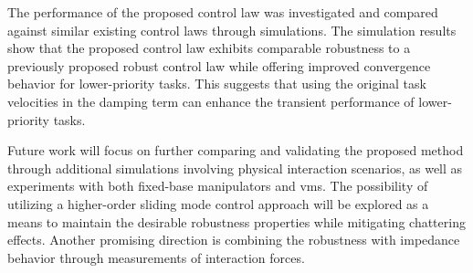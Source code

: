 \documentclass[../main.tex]{subfiles}
\begin{document}
The performance of the proposed control law was investigated and compared against similar existing control laws through simulations. The simulation results show that the proposed control law exhibits comparable robustness to a previously proposed robust control law while offering improved convergence behavior for lower-priority tasks. This suggests that using the original task velocities in the damping term can enhance the transient performance of lower-priority tasks.

Future work will focus on further comparing and validating the proposed method through additional simulations involving physical interaction scenarios, as well as experiments with both fixed-base manipulators and \gls{vms}. The possibility of utilizing a higher-order sliding mode control approach will be explored as a means to maintain the desirable robustness properties while mitigating chattering effects. Another promising direction is combining the robustness with impedance behavior through measurements of interaction forces.


\ifSubfilesClassLoaded{%
  
  
}{}
\end{document}
